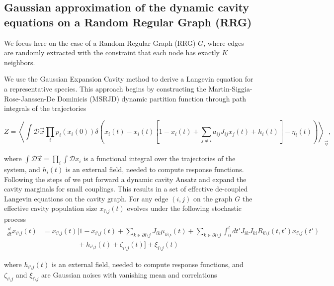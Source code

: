 \documentclass[
    preprint,
    linenumbers,
    amsmath,amssymb,amsfonts,
    aps, physrev,
    superscriptaddress,
    10pt,
    bibnotes
    ]{revtex4-2}
\begin{document}
\subsection{Gaussian approximation of the dynamic cavity equations on a Random
Regular Graph (RRG)}

We focus here on the case of a Random Regular Graph (RRG) $G$, where
edges are randomly extracted with the constraint that each node has
exactly $K$ neighbors. 

We use the Gaussian Expansion Cavity method \cite{}
to derive a Langevin equation for a representative species. This approach
begins by constructing the Martin-Siggia-Rose-Janssen-De Dominicis
(MSRJD) dynamic partition function through path integrals of the trajectories
\cite{martinStatisticalDynamicsClassical1973,janssenLagrangeanClassicalField1976,dedominicisDynamicsSubstituteReplicas1978}

\begin{equation}
Z=\left\langle \int\mathcal{D}\vec{x}\prod_{i}p_{i}\left(x_{i}\left(0\right)\right)\delta\left(\dot{x_{i}}(t)-x_{i}(t)\left[1-x_{i}(t)+\sum_{j\neq i}a_{ij}J_{ij}x_{j}(t)+h_{i}(t)\right]-\eta_{i}(t)\right)\right\rangle _{\vec{\eta}},
\end{equation}

where $\int\mathcal{D}\vec{x}=\prod_{i}\int\mathcal{D}x_{i}$ is a functional integral over the trajectories of the system, and $h_{i}(t)$ is an external field, needed to compute response functions. Following the steps of \cite{taraboloGaussianApproximationDynamic2025} we put forward a dynamic cavity Ansatz and expand the cavity marginals for small couplings. This results in a set of effective de-coupled Langevin equations on the cavity graph. For any edge $(i,j)$ on the graph $G$ the effective cavity population size $x_{i\setminus j}(t)$ evolves under the following stochastic process
\begin{align}
  \frac{d}{dt}x_{i\setminus j}(t) & =x_{i\setminus j}(t)\Biggl[1-x_{i\setminus j}(t)+\sum_{k\in\partial i\setminus j}J_{ik}\mu_{k\setminus i}(t) + \sum_{k\in\partial i\setminus j}\int_{0}^{t}dt'J_{ik}J_{ki}R_{k\setminus i}(t,t')x_{i\setminus j}(t') \nonumber \\
   & \qquad\quad \qquad +h_{i\setminus j}(t)+\zeta_{i\setminus j}(t)\Biggr]+\xi_{i\setminus j}(t)\label{eq:eff_proc_cav}
\end{align}

where $h_{i\setminus j}(t)$ is an external field, needed to compute response functions, and $\zeta_{i\setminus j}$ and $\xi_{i\setminus j}$ are Gaussian noises with vanishing mean and correlations
\end{document}
